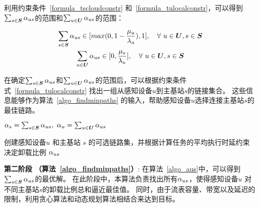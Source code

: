 利用约束条件~\eqref{formula_tscloudconstr} 和~\eqref{formula_tulocalconstr}，可以得到$\sum_{s \in \boldsymbol{S}}{\alpha}_{us}$的范围和$\sum_{u \in \boldsymbol{U}}{\alpha}_{us}$的范围：

\vspace{-1em}

\begin{equation*}
\begin{gathered}
\sum_{s \in \boldsymbol{S}}{\alpha}_{us} \in [max(0, 1- \frac{{\mu}_{u}}{{\lambda}_{u}}), 1], \quad \forall\ u \in \boldsymbol{U}, s \in \boldsymbol{S}\\
\sum_{u \in \boldsymbol{U}}{\alpha}_{us} \in [0, \frac{{\mu}_{s}}{{\lambda}_{u}}], \quad \forall\ u \in \boldsymbol{U}, s \in \boldsymbol{S}
\end{gathered}
\end{equation*}

在确定$\sum_{s \in \boldsymbol{S}}{\alpha}_{us}$和$\sum_{u \in \boldsymbol{U}}{\alpha}_{us}$的范围后，可以根据约束条件式~\eqref{formula_tulocalconstr} 找出一组从感知设备$u$到主基站$s$的链接集合。
这些信息能够作为算法~\ref{algo_findminpaths} 的输入，帮助感知设备$u$选择连接主基站$s$的最佳链路。

\begin{algorithm}[!h]
\setstretch{\algostretch}
${\alpha}_{s} = \sum_{s \in \boldsymbol{S}}{\alpha}_{us}, \  {\alpha}_{u} = \sum_{u \in \boldsymbol{U}}{\alpha}_{us}$\\
\KwOut{$\aus, \au, \Lus$}
\caption{创建感知设备$u$ 和主基站 $s$ 的可选链路集，并根据计算任务的平均执行时延约束决定卸载比例 ${\alpha}_{us}$}
\label{algo_aus}
\end{algorithm}

\textbf{第二阶段 （算法~\ref{algo_findminpaths}）}:
在算法~\ref{algo_aus}中，可以得到$\sum_{s \in \boldsymbol{S}}{\alpha}_{us}$的最优解。
在此阶段中，本算法负责找出所有${\alpha}_{us}$，使得感知设备$u$ 对不同主基站$s$的卸载比例总和逼近最佳值。
同时，由于流表容量、带宽以及延迟的限制，利用贪心算法和动态规划算法相结合来达到目标。

